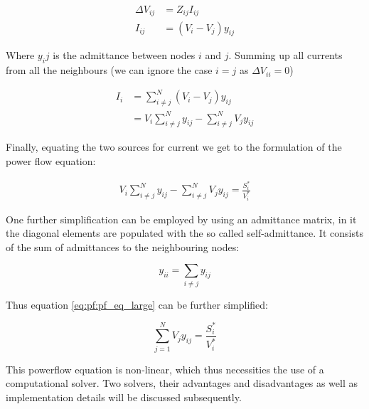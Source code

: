 \begin{equation}
    \begin{aligned}
        \Delta V_{ij} &= Z_{ij} I_{ij} \\
        I_{ij}        &= (V_i - V_j) y_{ij}
    \end{aligned}
\end{equation}

Where $y_ij$ is the admittance between nodes $i$ and $j$.
Summing up all currents from all the neighbours (we can ignore the case $i = j$ as $\Delta V_{ii} = 0$)

\begin{equation}
    \begin{aligned}
        I_{i} &= \sum_{i \ne j}^N (V_i - V_j) y_{ij}\\
              &= V_i \sum_{i \ne j}^N y_{ij} - \sum_{i \ne j}^N V_j y_{ij}
    \end{aligned}
\end{equation}

Finally, equating the two sources for current we get to the formulation of the power flow
equation:

\begin{equation}
    \begin{aligned}
        V_i \sum_{i \ne j}^N y_{ij} - \sum_{i \ne j}^N V_j y_{ij} = \frac{S_i^*}{V_i^*}
        \label{eq:pf:pf_eq_large}
    \end{aligned}
\end{equation}

One further simplification can be employed by using an admittance matrix, in it the diagonal elements are populated with the
so called self-admittance. It consists of the sum of admittances to the neighbouring nodes:

\begin{equation}
    y_{ii} = \sum_{i \ne j} y_{ij}
\end{equation}

Thus equation \ref{eq:pf:pf_eq_large} can be further simplified:

\begin{equation}
    \sum_{j=1}^N V_j y_{ij} = \frac{S_i^*}{V_i^*}
    \label{eq:pf:full_pf_eq}
\end{equation}

This powerflow equation is non-linear, which thus necessities the use of a computational
solver. Two solvers, their advantages and disadvantages as well as implementation details will
be discussed subsequently.\\
